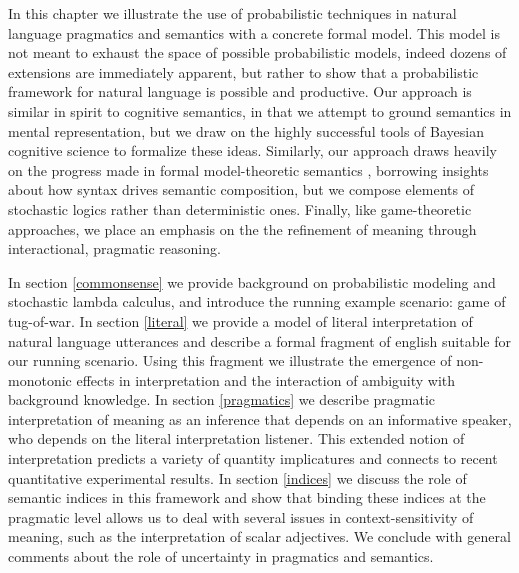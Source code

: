 \documentclass[12pt]{article}
\begin{document}


In this chapter we illustrate the use of probabilistic techniques in natural language pragmatics and semantics with a concrete formal model. This model is not meant to exhaust the space of possible probabilistic models, indeed dozens of extensions are immediately apparent, but rather to show that a probabilistic framework for natural language is possible and productive.
Our approach is similar in spirit to cognitive semantics, in that we attempt to ground semantics in mental representation, but we draw on the highly successful tools of Bayesian cognitive science to formalize these ideas. 
Similarly, our approach draws heavily on the progress made in formal model-theoretic semantics \cite{montague1973,heimkratzer1998}, borrowing insights about how syntax drives semantic composition, but we compose elements of stochastic logics rather than deterministic ones.
Finally, like game-theoretic approaches, we place an emphasis on the the refinement of meaning through interactional, pragmatic reasoning.

In section \ref{commonsense} we provide background on probabilistic modeling and stochastic lambda calculus, and introduce the running example scenario: game of tug-of-war. In section \ref{literal} we provide a model of literal interpretation of natural language utterances and describe a formal fragment of english suitable for our running scenario. Using this fragment we illustrate the emergence of non-monotonic effects in interpretation and the interaction of ambiguity with background knowledge. In section \ref{pragmatics} we describe pragmatic interpretation of meaning as an inference that depends on an informative speaker, who depends on the literal interpretation listener. This extended notion of interpretation predicts a variety of quantity implicatures and connects to recent quantitative experimental results. In section \ref{indices} we discuss the role of semantic indices in this framework and show that binding these indices at the pragmatic level allows us to deal with several issues in context-sensitivity of meaning, such as the interpretation of scalar adjectives. We conclude with general comments about the role of uncertainty in pragmatics and semantics.
\end{document}
